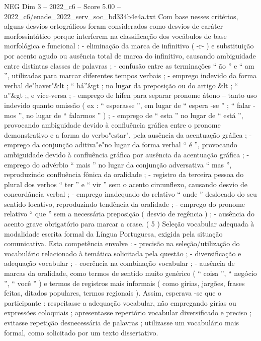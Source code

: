 \begin{textsample}{NEG Dim 3 – 2022\_c6 – Score 5.00 – 2022\_c6/enade\_2022\_serv\_soc\_bd334b4e4a.txt}
Com base nesses critérios, alguns desvios ortográficos foram considerados como desvios de caráter morfossintático porque interferem na classificação dos vocábulos de base morfológica e funcional : - eliminação da marca de infinitivo ( -r- ) e substituição por acento agudo ou ausência total de marca do infinitivo, causando ambiguidade entre distintas classes de palavras ; - confusão entre as terminações “ ão ” e “ am ”, utilizadas para marcar diferentes tempos verbais ; - emprego indevido da forma verbal de"haver"\&lt ; “ há”\&gt ; no lugar da preposição ou do artigo \&lt ; “ a”\&gt ;, e vice-versa ; - emprego de hífen para separar pronome átono – tanto uso indevido quanto omissão ( ex : “ esperasse ”, em lugar de “ espera -se ” ; “ falar -mos ”, no lugar de “ falarmos ” ) ; - emprego de “ esta ” no lugar de “ está ”, provocando ambiguidade devido à confluência gráfica entre o pronome demonstrativo e a forma do verbo"estar", pela ausência da acentuação gráfica ; - emprego da conjunção aditiva"e"no lugar da forma verbal “ é ”, provocando ambiguidade devido à confluência gráfica por ausência da acentuação gráfica ; - emprego do advérbio “ mais ” no lugar da conjunção adversativa “ mas ”, reproduzindo confluência fônica da oralidade ; - registro da terceira pessoa do plural dos verbos “ ter ” e “ vir ” sem o acento circunflexo, causando desvio de concordância verbal ; - emprego inadequado do relativo “ onde ” deslocado do seu sentido locativo, reproduzindo tendência da oralidade ; - emprego do pronome relativo “ que ” sem a necessária preposição ( desvio de regência ) ; - ausência do acento grave obrigatório para marcar a crase. ( 5 ) Seleção vocabular adequada à modalidade escrita formal da Língua Portuguesa, exigida pela situação comunicativa.
Esta competência envolve : - precisão na seleção/utilização do vocabulário relacionado à temática solicitada pela questão ; - diversificação e adequação vocabular ; - coerência na combinação vocabular ; - ausência de marcas da oralidade, como termos de sentido muito genérico ( “ coisa ”, “ negócio ”, “ você ” ) e termos de registros mais informais ( como gírias, jargões, frases feitas, ditados populares, termos regionais ).
Assim, esperava -se que o participante : respeitasse a adequação vocabular, não empregando gírias ou expressões coloquiais ; apresentasse repertório vocabular diversificado e preciso ; evitasse repetição desnecessária de palavras ; utilizasse um vocabulário mais formal, como solicitado por um texto dissertativo.

\end{textsample}
